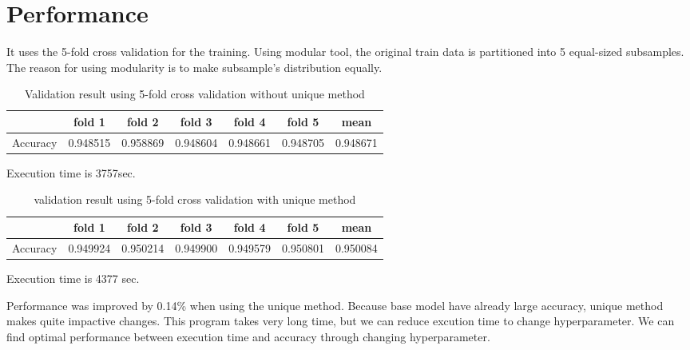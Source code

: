 \documentclass{article}
\begin{document}
\section{Performance}
It uses the 5-fold cross validation for the training. Using modular tool, the original train data is partitioned into 5 equal-sized subsamples. The reason for using modularity is to make subsample's distribution equally.\par
\begin{table} [ht]
\begin{center}
\caption{Validation result using 5-fold cross validation without unique method}
\begin{tabular} {c |c| c|c| c| c|c}
  \textbf{ } & \textbf{fold 1} & \textbf{fold 2}& \textbf{fold 3} & \textbf{fold 4}& \textbf{fold 5} & \textbf{mean}\\
\hline
Accuracy & 0.948515 & 0.958869 & 0.948604 & 0.948661 & 0.948705 & 0.948671\\
\end{tabular}
\end{center}
\end{table}
Execution time is 3757sec.\par
\begin{table} [ht]
\begin{center}
\caption{validation result using 5-fold cross validation with unique method}
\begin{tabular} {c |c| c|c| c| c|c}
  \textbf{ } & \textbf{fold 1} & \textbf{fold 2}& \textbf{fold 3} & \textbf{fold 4}& \textbf{fold 5} & \textbf{mean}\\
\hline
Accuracy & 0.949924 & 0.950214 & 0.949900 & 0.949579 & 0.950801 & 0.950084\\
\end{tabular}
\end{center}
\end{table}
Execution time is 4377 sec.\par
Performance was improved by 0.14\% when using the unique method. Because base model have already large accuracy, unique method makes quite impactive changes. This program takes very long time, but we can reduce excution time to change hyperparameter. We can find optimal performance between execution time and accuracy through changing hyperparameter. \par
\end{document}
